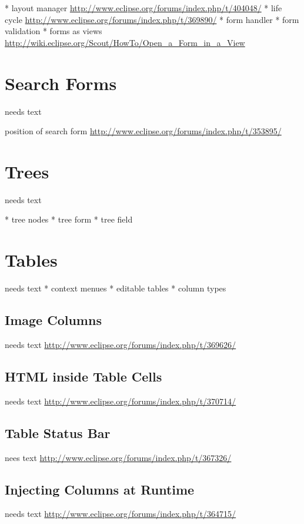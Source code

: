 \documentclass[a4paper,10pt,twoside]{book}
\begin{document}
    * layout manager \url{http://www.eclipse.org/forums/index.php/t/404048/}
    * life cycle \url{http://www.eclipse.org/forums/index.php/t/369890/}
	* form handler
	* form validation
	* forms as views \url{http://wiki.eclipse.org/Scout/HowTo/Open_a_Form_in_a_View}

\section{Search Forms}
needs text

position of search form \url{http://www.eclipse.org/forums/index.php/t/353895/}

\section{Trees}
needs text

    * tree nodes
	* tree form
	* tree field

\section{Tables}
needs text
	* context menues
	* editable tables
    * column types

\subsection{Image Columns}
needs text
\url{http://www.eclipse.org/forums/index.php/t/369626/}

\subsection{HTML inside Table Cells}
needs text
\url{http://www.eclipse.org/forums/index.php/t/370714/}

\subsection{Table Status Bar}
nees text
\url{http://www.eclipse.org/forums/index.php/t/367326/}

\subsection{Injecting Columns at Runtime}
needs text
\url{http://www.eclipse.org/forums/index.php/t/364715/}
\end{document}
